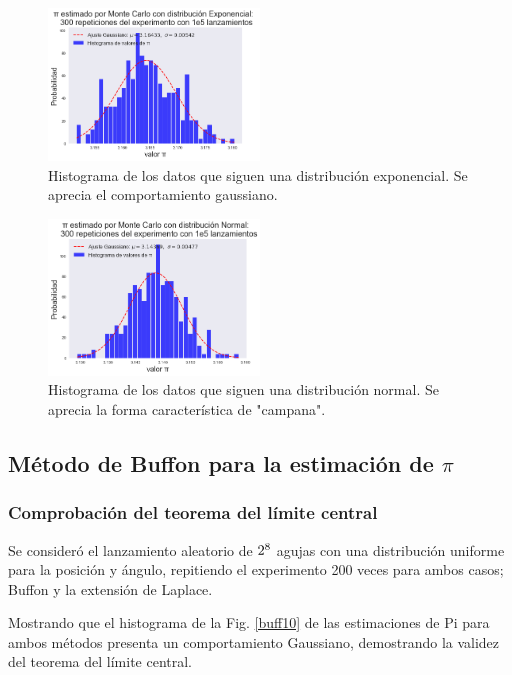 \documentclass{rbf}
\begin{document}
\begin{figure}[tbp!]
 \centering
  \includegraphics[width=0.5\textwidth]{figures/exp.png}
	\caption{Histograma de los datos que siguen una distribución exponencial. Se aprecia el comportamiento gaussiano.}
 \label{buff8}
\end{figure}

\begin{figure}[h]
 \centering
  \includegraphics[width=0.5\textwidth]{figures/norm.png}
	\caption{Histograma de los datos que siguen una distribución normal. Se aprecia la forma característica de "campana".}
 \label{buff9}
\end{figure}

\subsection{Método de Buffon para la estimación de $\pi$}

\subsubsection{Comprobación del teorema del límite central}

Se consideró el lanzamiento aleatorio de $2 \time 10^8$ agujas con una distribución uniforme para la posición y ángulo, repitiendo el experimento 200 veces para ambos casos; Buffon y la extensión de Laplace.

Mostrando que el histograma de la Fig. \ref{buff10} de las estimaciones de Pi para ambos métodos presenta un comportamiento Gaussiano, demostrando la validez del teorema del límite central.
\end{document}
